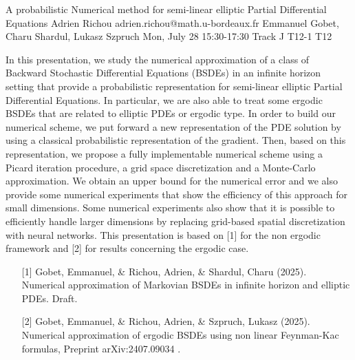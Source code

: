 \begin{talk}
  {A probabilistic Numerical method for semi-linear elliptic Partial Differential Equations}%
  {Adrien Richou}%
  {adrien.richou@math.u-bordeaux.fr}%
  {Emmanuel Gobet, Charu Shardul, Lukasz Szpruch}%
  {}%
  {}%
  {Mon, July 28 15:30-17:30 Track J}%
  {T12-1}%
  {T12}%
			
In this presentation, we study the numerical approximation of a class of Backward Stochastic Differential Equations (BSDEs) in an infinite horizon setting that provide a probabilistic representation for semi-linear elliptic Partial Differential Equations. In particular, we are also able to treat some ergodic BSDEs that are related to elliptic PDEs or ergodic type. In order to build our numerical scheme, we put forward a new representation of the PDE solution by using a classical probabilistic representation of the gradient. Then, based on this representation, we propose a fully implementable numerical scheme using a Picard iteration procedure, a grid space discretization and a Monte-Carlo approximation. We obtain an upper bound for the numerical error and we also provide some numerical experiments that show the
efficiency of this approach for small dimensions. Some numerical experiments also show that it is possible to efficiently handle larger dimensions by replacing grid-based spatial discretization with neural networks. This presentation is based on [1] for the non ergodic framework and [2] for results concerning the ergodic case.

\medskip

\begin{enumerate}
	\item[{[1]}] Gobet, Emmanuel, \& Richou, Adrien, \& Shardul, Charu (2025). Numerical approximation of Markovian BSDEs in infinite
  horizon and elliptic PDEs. Draft.
	\item[{[2]}] Gobet, Emmanuel, \& Richou, Adrien, \& Szpruch, Lukasz (2025).  Numerical approximation of ergodic BSDEs using non
  linear Feynman-Kac formulas, Preprint arXiv:2407.09034 .
\end{enumerate}

\end{talk}
